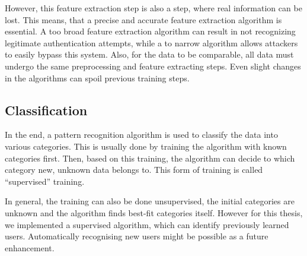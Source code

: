 However, this feature extraction step is also a step, where real information can be lost. This means, that a precise and accurate feature extraction algorithm is essential. A too broad feature extraction algorithm can result in not recognizing legitimate authentication attempts, while a to narrow algorithm allows attackers to easily bypass this system. Also, for the data to be comparable, all data must undergo the same preprocessing and feature extracting steps. Even slight changes in the algorithms can spoil previous training steps.

\subsection{Classification}
In the end, a pattern recognition algorithm is used to classify the data into various categories. This is usually done by training the algorithm with known categories first. Then, based on this training, the algorithm can decide to which category new, unknown data belongs to. This form of training is called ``supervised'' training.

In general, the training can also be done unsupervised, \ie the initial categories are unknown and the algorithm finds best-fit categories itself. However for this thesis, we implemented a supervised algorithm, which can identify previously learned users. Automatically recognising new users might be possible as a future enhancement.